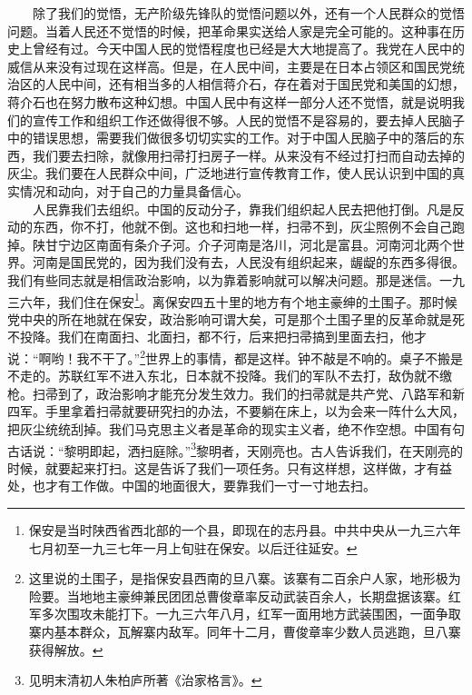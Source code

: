 \documentclass[cn,11pt,chinese]{elegantbook}
\begin{document}
　　除了我们的觉悟，无产阶级先锋队的觉悟问题以外，还有一个人民群众的觉悟问题。当着人民还不觉悟的时候，把革命果实送给人家是完全可能的。这种事在历史上曾经有过。今天中国人民的觉悟程度也已经是大大地提高了。我党在人民中的威信从来没有过现在这样高。但是，在人民中间，主要是在日本占领区和国民党统治区的人民中间，还有相当多的人相信蒋介石，存在着对于国民党和美国的幻想，蒋介石也在努力散布这种幻想。中国人民中有这样一部分人还不觉悟，就是说明我们的宣传工作和组织工作还做得很不够。人民的觉悟不是容易的，要去掉人民脑子中的错误思想，需要我们做很多切切实实的工作。对于中国人民脑子中的落后的东西，我们要去扫除，就像用扫帚打扫房子一样。从来没有不经过打扫而自动去掉的灰尘。我们要在人民群众中间，广泛地进行宣传教育工作，使人民认识到中国的真实情况和动向，对于自己的力量具备信心。\\
　　人民靠我们去组织。中国的反动分子，靠我们组织起人民去把他打倒。凡是反动的东西，你不打，他就不倒。这也和扫地一样，扫帚不到，灰尘照例不会自己跑掉。陕甘宁边区南面有条介子河。介子河南是洛川，河北是富县。河南河北两个世界。河南是国民党的，因为我们没有去，人民没有组织起来，龌龊的东西多得很。我们有些同志就是相信政治影响，以为靠着影响就可以解决问题。那是迷信。一九三六年，我们住在保安\footnote[13]{ 保安是当时陕西省西北部的一个县，即现在的志丹县。中共中央从一九三六年七月初至一九三七年一月上旬驻在保安。以后迁往延安。}。离保安四五十里的地方有个地主豪绅的土围子。那时候党中央的所在地就在保安，政治影响可谓大矣，可是那个土围子里的反革命就是死不投降。我们在南面扫、北面扫，都不行，后来把扫帚搞到里面去扫，他才说：“啊哟！我不干了。”\footnote[14]{ 这里说的土围子，是指保安县西南的旦八寨。该寨有二百余户人家，地形极为险要。当地地主豪绅兼民团团总曹俊章率反动武装百余人，长期盘据该寨。红军多次围攻未能打下。一九三六年八月，红军一面用地方武装围困，一面争取寨内基本群众，瓦解寨内敌军。同年十二月，曹俊章率少数人员逃跑，旦八寨获得解放。}世界上的事情，都是这样。钟不敲是不响的。桌子不搬是不走的。苏联红军不进入东北，日本就不投降。我们的军队不去打，敌伪就不缴枪。扫帚到了，政治影响才能充分发生效力。我们的扫帚就是共产党、八路军和新四军。手里拿着扫帚就要研究扫的办法，不要躺在床上，以为会来一阵什么大风，把灰尘统统刮掉。我们马克思主义者是革命的现实主义者，绝不作空想。中国有句古话说：“黎明即起，洒扫庭除。”\footnote[15]{ 见明末清初人朱柏庐所著《治家格言》。}黎明者，天刚亮也。古人告诉我们，在天刚亮的时候，就要起来打扫。这是告诉了我们一项任务。只有这样想，这样做，才有益处，也才有工作做。中国的地面很大，要靠我们一寸一寸地去扫。\\
\end{document}
